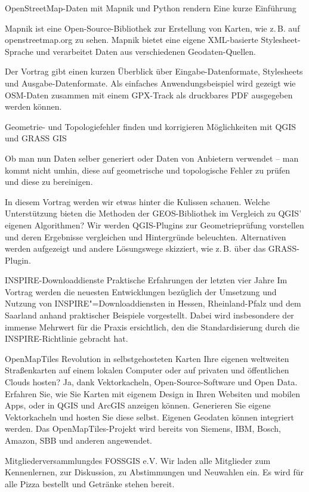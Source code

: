 %
{OpenStreetMap-Daten mit Mapnik und Python rendern\vspace{0.2em}}%
{Eine kurze Einführung}%
{%
Mapnik ist eine Open-Source-Bibliothek zur Erstellung von Karten, wie z.\,B. auf openstreetmap.org
zu sehen. Mapnik bietet eine eigene XML-basierte Stylesheet-Sprache und verarbeitet Daten aus
verschiedenen Geodaten-Quellen.

Der Vortrag gibt einen kurzen Überblick über Eingabe-Datenformate, Stylesheets und
Ausgabe-Datenformate. Als einfaches Anwendungsbeispiel wird gezeigt wie OSM-Daten zusammen
mit einem GPX-Track als druckbares PDF ausgegeben werden können.
}

%
{Geometrie- und Topologiefehler finden und korrigieren}%
{Möglichkeiten mit QGIS und GRASS GIS}%
{%
Ob man nun Daten selber generiert oder Daten von Anbietern verwendet -- man kommt nicht umhin, diese
auf geometrische und topologische Fehler zu prüfen und diese zu bereinigen.

In diesem Vortrag werden wir etwas hinter die Kulissen schauen. Welche Unterstützung bieten die
Methoden der GEOS-Bibliothek im Vergleich zu QGIS' eigenen Algorithmen? Wir werden QGIS-Plugins zur
Geometrieprüfung vorstellen und deren Ergebnisse vergleichen und Hintergründe beleuchten.
Alternativen werden aufgezeigt und andere Lösungswege skizziert, wie z.\,B. über das GRASS-Plugin.%
}

%
{INSPIRE-Downloaddienste}%
{Praktische Erfahrungen der letzten vier Jahre}%
{%
Im Vortrag werden die neuesten Entwicklungen bezüglich der Umsetzung und Nutzung von
INSPIRE"=Downloaddiensten in Hessen, Rheinland-Pfalz und dem Saarland anhand praktischer
Beispiele vorgestellt. Dabei wird insbesondere der immense Mehrwert für die Praxis ersichtlich, den
die Standardisierung durch die INSPIRE-Richtlinie gebracht hat.%
}

%
{OpenMapTiles}%
{Revolution in selbstgehosteten Karten}%
{%
Ihre eigenen weltweiten Straßenkarten auf einem lokalen Computer oder auf privaten und öffentlichen
Clouds hosten? Ja, dank Vektorkacheln, Open-Source-Software und Open Data. Erfahren Sie, wie Sie
Karten mit eigenem Design in Ihren Websiten und mobilen Apps, oder in QGIS und ArcGIS anzeigen
können. Generieren Sie eigene Vektorkacheln und hosten Sie diese selbst. Eigenen Geodaten können
integriert werden. Das OpenMapTiles-Projekt wird bereits von Siemens, IBM, Bosch, Amazon, SBB und
anderen angewendet.%
}

\abstractAPH{}%
{Mitgliederversammlung\linebreak des FOSSGIS e.V.}%
{}%
{%
Wir laden alle Mitglieder zum
Kennenlernen, zur Diskussion, zu Abstimmungen und Neuwahlen ein. Es wird für alle Pizza bestellt und Getränke
stehen bereit.%
}
